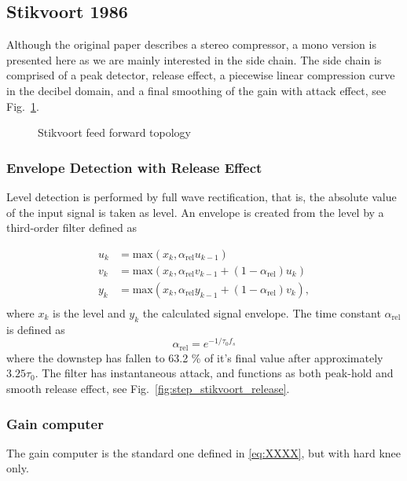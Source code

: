 \documentclass[../main2.tex]{subfiles}
\providecommand{\rootdir}{..}
\begin{document}
\subsection{Stikvoort 1986}
\FloatBarrier
Although the original paper describes a stereo compressor, a mono version is presented here as we are mainly interested in the side chain. The side chain is comprised of a peak detector, release effect, a piecewise linear compression curve in the decibel domain, and a final smoothing of the gain with attack effect, see Fig.~\ref{fig:block_stikvoort}.

\begin{figure}[h]
\centerline{}
\caption{Stikvoort feed forward topology}
\label{fig:block_stikvoort}
\end{figure}

\subsubsection{Envelope Detection with Release Effect}
Level detection is performed by full wave rectification, that is, the absolute value of the input signal is taken as level. An envelope is created from the level by a third-order filter defined as

\begin{equation}\label{eq:stikvoort_release}
\begin{split}
u_k &= \text{max}(x_k, \alpha_{\text{rel}} u_{k-1}) \\
v_k &= \text{max}(x_k, \alpha_{\text{rel}} v_{k-1} + (1-\alpha_{\text{rel}}) u_k) \\
y_k &= \text{max}(x_k, \alpha_{\text{rel}} y_{k-1} + (1-\alpha_{\text{rel}}) v_k),\\
\end{split}
\end{equation}
where $x_k$ is the level and $y_k$ the calculated signal envelope.  The time constant $\alpha_{\text{rel}}$ is defined as
\begin{equation}
\alpha_\text{rel} = e^{-1/\tau_0 f_s}
\end{equation}
where the downstep has fallen to 63.2 \% of it's final value after approximately $3.25 \tau_0$. The filter has instantaneous attack, and functions as both peak-hold and smooth release effect, see Fig.~\ref{fig:step_stikvoort_release}.

\subsubsection{Gain computer}
The gain computer is the standard one defined in \eqref{eq:XXXX}, but with hard knee only.
\end{document}
